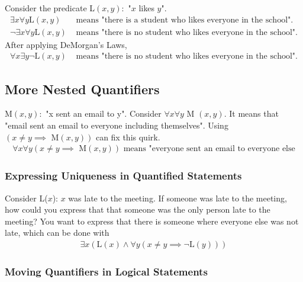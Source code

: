 \noindent Consider the predicate L$(x,y):$ "$x$ likes $y$".
\begin{align*}
  \exists x \forall y \text{L}(x, y)       & \text{ means "there is a student who likes everyone in the school".}  \\
  \lnot \exists x \forall y \text{L}(x, y) & \text{ means "there is no student who likes everyone in the school".}
\end{align*}
After applying DeMorgan's Laws,
\begin{align*}
  \forall x \exists y \lnot \text{L}(x, y) & \text{ means "there is no student who likes everyone in the school".}
\end{align*}

\subsection{More Nested Quantifiers}

M$(x, y):$ "x sent an email to y". Consider $\forall x \forall y$ M $(x, y)$.
It means that "email sent an email to everyone including themselves".
Using $( x \not = y \implies \text{ M}(x, y))$ can fix this quirk.
\begin{align*}
  \forall x \forall y (x \not = y \implies \text{ M}(x, y))
  \text{ means "everyone sent an email to everyone else}
\end{align*}

\subsubsection{Expressing Uniqueness in Quantified Statements}

Consider L($x$): $x$ was late to the meeting. If someone was late to the meeting,
how could you express that that someone was the only person late to the meeting?
You want to express that there is someone where everyone else was not late, which
can be done with
\begin{align*}
  \exists x (\text{L}(x) \land \forall y (x \not = y \implies \lnot \text{L}(y)))
\end{align*}

\subsubsection{Moving Quantifiers in Logical Statements}

